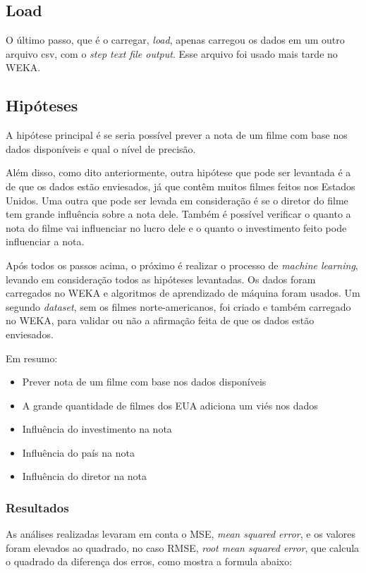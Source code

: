 \subsection{Load}
O último passo, que é o carregar, \textit{load}, apenas carregou os dados em um outro arquivo csv, com o \textit{step text file output}. Esse arquivo foi usado mais tarde no WEKA.

\subsection{Hipóteses}
A hipótese principal é se seria possível prever a nota de um filme com base nos dados disponíveis e qual o nível de precisão.

Além disso, como dito anteriormente, outra hipótese que pode ser levantada é a de que os dados estão enviesados, já que contêm muitos filmes feitos nos Estados Unidos. Uma outra que pode ser levada em consideração é se o diretor do filme tem grande influência sobre a nota dele. Também é possível verificar o quanto a nota do filme vai influenciar no lucro dele e o quanto o investimento feito pode influenciar a nota.

Após todos os passos acima, o próximo é realizar o processo de \textit{machine learning}, levando em consideração todos as hipóteses levantadas. Os dados foram carregados no WEKA e algoritmos de aprendizado de máquina foram usados. Um segundo \textit{dataset}, sem os filmes norte-americanos, foi criado e também carregado no WEKA, para validar ou não a afirmação feita de que os dados estão enviesados. 

Em resumo:

\begin{itemize}
    \item Prever nota de um filme com base nos dados disponíveis
    \item A grande quantidade de filmes dos EUA adiciona um viés nos dados
    \item Influência do investimento na nota
    \item Influência do país na nota
    \item Influência do diretor na nota
\end{itemize}

\subsubsection{Resultados}
As análises realizadas levaram em conta o MSE, \textit{mean squared error}, e os valores foram elevados ao quadrado, no caso RMSE, \textit{root mean squared error}, que calcula o quadrado da diferença dos erros, como mostra a formula abaixo:

